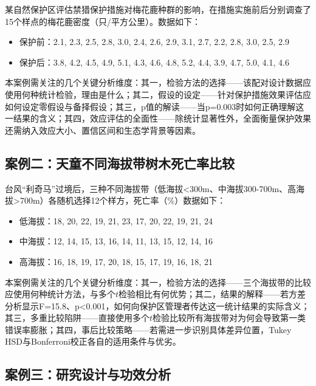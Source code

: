 \documentclass[
  twoside,12pt,fontset=none]{ctexbook}
\providecommand{\tightlist}{%
  \setlength{\itemsep}{0pt}\setlength{\parskip}{0pt}}
\begin{document}
某自然保护区评估禁猎保护措施对梅花鹿种群的影响，在措施实施前后分别调查了15个样点的梅花鹿密度（只/平方公里）。数据如下：

\begin{itemize}
\tightlist
\item
  保护前：2.1, 2.3, 2.5, 2.8, 3.0, 2.4, 2.6, 2.9, 3.1, 2.7, 2.2, 2.8, 3.0, 2.5, 2.9
\item
  保护后：3.8, 4.2, 4.5, 4.9, 5.1, 4.3, 4.6, 4.8, 5.2, 4.4, 3.9, 4.7, 5.0, 4.1, 4.6
\end{itemize}

本案例需关注的几个关键分析维度：其一，检验方法的选择------该配对设计数据应使用何种统计检验，理由是什么；其二，假设的设定------针对保护措施效果评估应如何设定零假设与备择假设；其三，p值的解读------当p=0.003时如何正确理解这一结果的含义；其四，效应评估的全面性------除统计显著性外，全面衡量保护效果还需纳入效应大小、置信区间和生态学背景等因素。

\hypertarget{ux6848ux4f8bux4e8cux5929ux7ae5ux4e0dux540cux6d77ux62d4ux5e26ux6811ux6728ux6b7bux4ea1ux7387ux6bd4ux8f83}{%
\subsection{案例二：天童不同海拔带树木死亡率比较}\label{ux6848ux4f8bux4e8cux5929ux7ae5ux4e0dux540cux6d77ux62d4ux5e26ux6811ux6728ux6b7bux4ea1ux7387ux6bd4ux8f83}}

台风``利奇马''过境后，三种不同海拔带（低海拔\textless300m、中海拔300-700m、高海拔\textgreater700m）各随机选择12个样方，死亡率（\%）数据如下：

\begin{itemize}
\tightlist
\item
  低海拔：18, 20, 22, 19, 21, 23, 17, 20, 22, 19, 21, 24
\item
  中海拔：12, 14, 15, 13, 16, 14, 11, 13, 15, 12, 14, 16
\item
  高海拔：16, 18, 19, 17, 20, 18, 15, 17, 19, 16, 18, 21
\end{itemize}

本案例需关注的几个关键分析维度：其一，检验方法的选择------三个海拔带的比较应使用何种统计方法，与多个\(t\)检验相比有何优势；其二，结果的解释------若方差分析显示F=15.8、p\textless0.001，如何向保护区管理者传达这一统计结果的实际含义；其三，多重比较陷阱------直接使用多个\(t\)检验比较所有海拔带对为何会导致第一类错误率膨胀；其四，事后比较策略------若需进一步识别具体差异位置，Tukey HSD与Bonferroni校正各自的适用条件与优劣。

\hypertarget{ux6848ux4f8bux4e09ux7814ux7a76ux8bbeux8ba1ux4e0eux529fux6548ux5206ux6790}{%
\subsection{案例三：研究设计与功效分析}\label{ux6848ux4f8bux4e09ux7814ux7a76ux8bbeux8ba1ux4e0eux529fux6548ux5206ux6790}}
\end{document}
